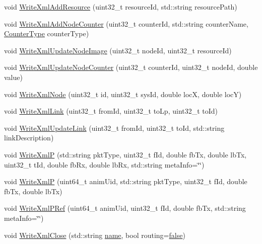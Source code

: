 \begin{DoxyCompactItemize}
\item 
void \hyperlink{classns3_1_1AnimationInterface_a46d988e3ecd62c38ac52d91d9e90bf43}{Write\+Xml\+Add\+Resource} (uint32\+\_\+t resource\+Id, std\+::string resource\+Path)
\item 
void \hyperlink{classns3_1_1AnimationInterface_a417a6692c50cfcf2e36848b4a93fbe89}{Write\+Xml\+Add\+Node\+Counter} (uint32\+\_\+t counter\+Id, std\+::string counter\+Name, \hyperlink{classns3_1_1AnimationInterface_a81ef0777d382c5eef63ea798d0ca74b9}{Counter\+Type} counter\+Type)
\item 
void \hyperlink{classns3_1_1AnimationInterface_ad68ff1046294cd206e29c73ad8eb48f4}{Write\+Xml\+Update\+Node\+Image} (uint32\+\_\+t node\+Id, uint32\+\_\+t resource\+Id)
\item 
void \hyperlink{classns3_1_1AnimationInterface_a73b7fb0dac81671339eb8130ad157607}{Write\+Xml\+Update\+Node\+Counter} (uint32\+\_\+t counter\+Id, uint32\+\_\+t node\+Id, double value)
\item 
void \hyperlink{classns3_1_1AnimationInterface_aad39fa41445e8b8241044ace1c55d773}{Write\+Xml\+Node} (uint32\+\_\+t id, uint32\+\_\+t sys\+Id, double locX, double locY)
\item 
void \hyperlink{classns3_1_1AnimationInterface_afc4385b58dc89ec2304f4173d27d168a}{Write\+Xml\+Link} (uint32\+\_\+t from\+Id, uint32\+\_\+t to\+Lp, uint32\+\_\+t to\+Id)
\item 
void \hyperlink{classns3_1_1AnimationInterface_add8c87f28548efdb811b6472225e362c}{Write\+Xml\+Update\+Link} (uint32\+\_\+t from\+Id, uint32\+\_\+t to\+Id, std\+::string link\+Description)
\item 
void \hyperlink{classns3_1_1AnimationInterface_aa44bd8e76ff1ff7b0d3ac9e5add0a61d}{Write\+XmlP} (std\+::string pkt\+Type, uint32\+\_\+t f\+Id, double fb\+Tx, double lb\+Tx, uint32\+\_\+t t\+Id, double fb\+Rx, double lb\+Rx, std\+::string meta\+Info=\char`\"{}\char`\"{})
\item 
void \hyperlink{classns3_1_1AnimationInterface_ae5fa23ae9ef335ae051377d71ed69b88}{Write\+XmlP} (uint64\+\_\+t anim\+Uid, std\+::string pkt\+Type, uint32\+\_\+t f\+Id, double fb\+Tx, double lb\+Tx)
\item 
void \hyperlink{classns3_1_1AnimationInterface_a439bf881b558e2aa294c070ed0472e35}{Write\+Xml\+P\+Ref} (uint64\+\_\+t anim\+Uid, uint32\+\_\+t f\+Id, double fb\+Tx, std\+::string meta\+Info=\char`\"{}\char`\"{})
\item 
void \hyperlink{classns3_1_1AnimationInterface_a98e7178a68a9d19f62eaf118b48cf545}{Write\+Xml\+Close} (std\+::string \hyperlink{generate__test__data__lte__spectrum__model_8m_ab74e6bf80237ddc4109968cedc58c151}{name}, bool routing=\hyperlink{lte__cqi__generation_8m_ab1bef239d413c4da139c4bac92cd657a}{false})

\end{DoxyCompactItemize}
